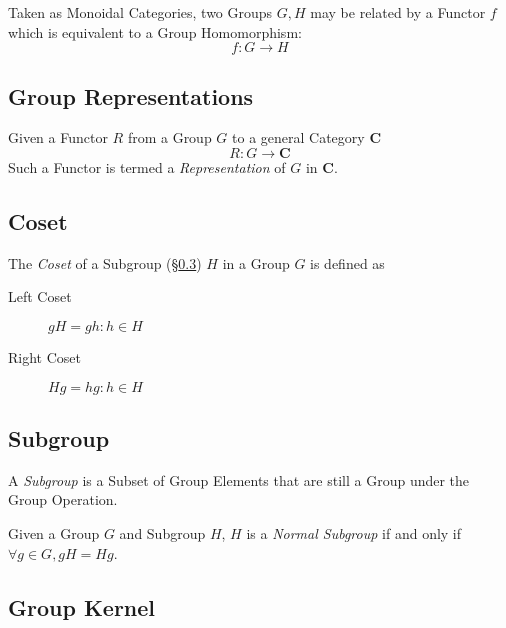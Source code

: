 \documentclass{article}
\begin{document}
Taken as Monoidal Categories, two Groups $G, H$ may be related by a
Functor $f$ which is equivalent to a Group Homomorphism:
\[
    f : G \rightarrow H
\]

\subsection{Group Representations}\label{subsec:group_representation}

Given a Functor $R$ from a Group $G$ to a general Category
$\mathbf{C}$
\[
    R : G \rightarrow \mathbf{C}
\]
Such a Functor is termed a \emph{Representation} of $G$ in $\mathbf{C}$.

\subsection{Coset}\label{subsec:group_coset}

The \emph{Coset} of a Subgroup (\S\ref{subsec:subgroup}) $H$ in a Group $G$
is defined as
\begin{description}
\item[Left Coset] $gH = {gh : h \in H}$
\item[Right Coset] $Hg = {hg : h \in H}$
\end{description}

\subsection{Subgroup}\label{subsec:subgroup}

A \emph{Subgroup} is a Subset of Group Elements that are still a Group
under the Group Operation.

Given a Group $G$ and Subgroup $H$, $H$ is a \emph{Normal Subgroup} if
and only if $\forall g \in G, gH = Hg$.

\subsection{Group Kernel}\label{subsec:group_kernel}
\end{document}
